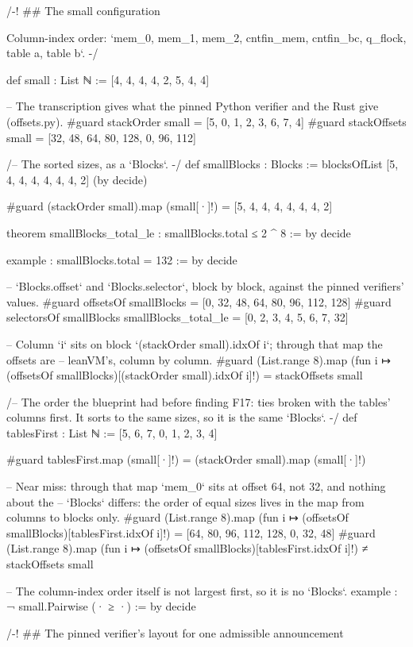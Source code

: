 \begin{leancode}
/-! ## The small configuration

Column-index order: `mem_0, mem_1, mem_2, cntfin_mem, cntfin_bc, q_flock, table a, table b`. -/

def small : List ℕ := [4, 4, 4, 4, 2, 5, 4, 4]

-- The transcription gives what the pinned Python verifier and the Rust give (offsets.py).
#guard stackOrder small = [5, 0, 1, 2, 3, 6, 7, 4]
#guard stackOffsets small = [32, 48, 64, 80, 128, 0, 96, 112]

/-- The sorted sizes, as a `Blocks`. -/
def smallBlocks : Blocks := blocksOfList [5, 4, 4, 4, 4, 4, 4, 2] (by decide)

#guard (stackOrder small).map (small[·]!) = [5, 4, 4, 4, 4, 4, 4, 2]

theorem smallBlocks_total_le : smallBlocks.total ≤ 2 ^ 8 := by decide

example : smallBlocks.total = 132 := by decide

-- `Blocks.offset` and `Blocks.selector`, block by block, against the pinned verifiers' values.
#guard offsetsOf smallBlocks = [0, 32, 48, 64, 80, 96, 112, 128]
#guard selectorsOf smallBlocks smallBlocks_total_le = [0, 2, 3, 4, 5, 6, 7, 32]

-- Column `i` sits on block `(stackOrder small).idxOf i`; through that map the offsets are
-- leanVM's, column by column.
#guard (List.range 8).map (fun i ↦ (offsetsOf smallBlocks)[(stackOrder small).idxOf i]!) =
  stackOffsets small

/-- The order the blueprint had before finding F17: ties broken with the tables' columns
first. It sorts to the same sizes, so it is the same `Blocks`. -/
def tablesFirst : List ℕ := [5, 6, 7, 0, 1, 2, 3, 4]

#guard tablesFirst.map (small[·]!) = (stackOrder small).map (small[·]!)

-- Near miss: through that map `mem_0` sits at offset 64, not 32, and nothing about the
-- `Blocks` differs: the order of equal sizes lives in the map from columns to blocks only.
#guard (List.range 8).map (fun i ↦ (offsetsOf smallBlocks)[tablesFirst.idxOf i]!) =
  [64, 80, 96, 112, 128, 0, 32, 48]
#guard (List.range 8).map (fun i ↦ (offsetsOf smallBlocks)[tablesFirst.idxOf i]!) ≠
  stackOffsets small

-- The column-index order itself is not largest first, so it is no `Blocks`.
example : ¬ small.Pairwise (· ≥ ·) := by decide

/-! ## The pinned verifier's layout for one admissible announcement


\end{leancode}

